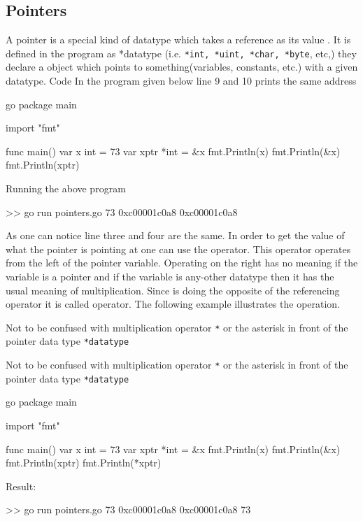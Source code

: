 \documentclass[12pt,a4paper]{report}
\begin{document}
\subsection{Pointers}
A pointer is a special kind of datatype which takes a reference as its value . It is defined in the program as *datatype (i.e. \texttt{*int, *uint, *char, *byte}, etc,) they declare a  object which points to something(variables, constants, etc.) with a given datatype. Code 
In the program given below line 9 and 10 prints the same address
%
\begin{code}{go}
package main

import "fmt"

func main() {
  var x int = 73
  var xptr *int = &x
  fmt.Println(x)
  fmt.Println(&x)
  fmt.Println(xptr)
}
\end{code}
%
Running the above program
\begin{literal}
>> go run pointers.go
73
0xc00001c0a8
0xc00001c0a8
\end{literal}
%
As one can notice line three and four are the same. In order to get the value of what the pointer is pointing at one can use the \pre{*} operator. This operator operates from the left of the pointer variable. Operating on the right has no meaning if the variable is a pointer and if the variable is any-other datatype then it has the usual meaning of multiplication. Since \pre{*} is doing the opposite of the referencing operator \pre{\&} it is called  operator. The following example illustrates the operation.
%
\begin{note}
	Not to be confused with multiplication operator \texttt{*} or the asterisk in front of the pointer data type \texttt{*datatype}
\end{note}
\begin{note}
	Not to be confused with multiplication operator \texttt{*} or the asterisk in front of the pointer data type \texttt{*datatype}
\end{note}
%
\begin{lazycode}[code title,label={myCodeLabel},nameref={code title}]{go}
package main

import "fmt"

func main() {
  var x int = 73
  var xptr *int = &x
  fmt.Println(x)
  fmt.Println(&x)
  fmt.Println(xptr)
  fmt.Println(*xptr)
}
\end{lazycode}
%
Result:
%
\begin{literal}
>> go run pointers.go
73
0xc00001c0a8
0xc00001c0a8
73
\end{literal}
\end{document}
